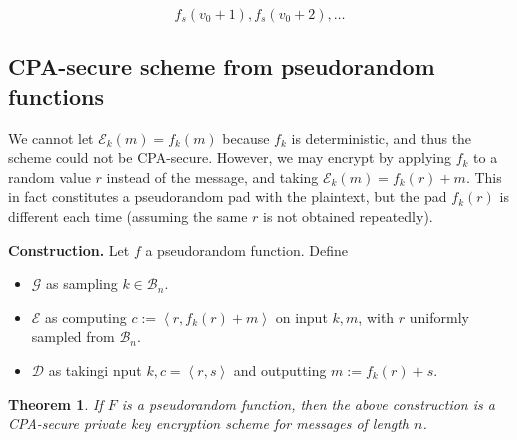 \documentclass[a4paper, 12pt]{article}
\newtheorem{theorem}{Theorem}
\newtheorem{theorem}{Theorem}
\begin{document}
\begin{equation*}
    f_s(v_0 + 1), f_s(v_0 + 2),\ldots
\end{equation*}

\subsection{CPA-secure scheme from pseudorandom functions}

We cannot let $\mathcal{E}_k(m) = f_k(m)$ because $f_k$ is deterministic, and
thus the scheme could not be CPA-secure. However, we may encrypt by applying
$f_k$ to a random value $r$ instead of the message, and taking
$\mathcal{E}_k(m) = f_k(r) + m$. This in fact constitutes a pseudorandom pad
with the plaintext, but the pad $f_k(r)$ is different each time 
(assuming the same $r$ is not obtained repeatedly). 

\textbf{Construction.} Let $f$ a pseudorandom function. Define 

\begin{itemize}
    \item $\mathcal{G}$ as sampling $k \in \mathcal{B}_n$.
    \item $\mathcal{E}$ as computing $c:= \left< r, f_k(r) + m \right>$ 
        on input $k, m$, with $r$ uniformly sampled from $\mathcal{B}_n$.
    \item $\mathcal{D}$ as takingi nput $k, c = \left< r, s \right>$ and 
        outputting $m := f_k(r) + s$.
\end{itemize}

\begin{theorem}
    If $F$ is a pseudorandom function, then the above construction is  a
    CPA-secure private key encryption scheme for messages of length $n$.
\end{theorem}
\end{document}
